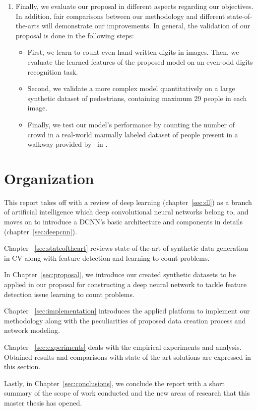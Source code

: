 \begin{enumerate}
	\item Finally, we evaluate our proposal in different aspects regarding our objectives. In addition, fair comparisons between our methodology and different state-of-the-arts will demonstrate our improvements. In general, the validation of our proposal is done in the following steps:

	\begin{itemize}
		\item First, we learn to count even hand-written digits in images. Then, we evaluate the learned features of the proposed model on an even-odd digits recognition task. 
		\item Second, we validate a more complex model  quantitatively on a large synthetic dataset of pedestrians, containing maximum 29 people in each image. 
		\item Finally, we test our model's performance by counting the number of crowd in a real-world manually labeled dataset of people present in a walkway provided by~\citeauthor{chan2013ground} in \cite{chan2013ground}. 
	\end{itemize}
	
\end{enumerate}

\section{Organization}

This report takes off with a review of deep learning (chapter~\ref{sec:dl}) as a branch of artificial intelligence which deep convolutional neural networks belong to, and moves on to introduce a DCNN's basic architecture and components in details (chapter~\ref{sec:deepcnn}). 


Chapter ~\ref{sec:stateoftheart} reviews state-of-the-art of synthetic data generation in CV along with feature detection and learning to count problems. 

In Chapter~\ref{sec:proposal}, we introduce our created synthetic datasets to be applied in our proposal for constructing a deep neural network to tackle feature detection issue learning to count problems. 

Chapter ~\ref{sec:implementation} introduces the applied platform to implement our methodology along with the peculiarities of proposed data creation process and network modeling. 

Chapter ~\ref{sec:experiments} deals with the empirical experiments and analysis. Obtained results and comparisons with state-of-the-art solutions are expressed in this section.

Lastly, in Chapter~\ref{sec:conclusions}, we conclude the report with a short summary of the scope of work conducted and the new areas of research that this master thesis has opened.
